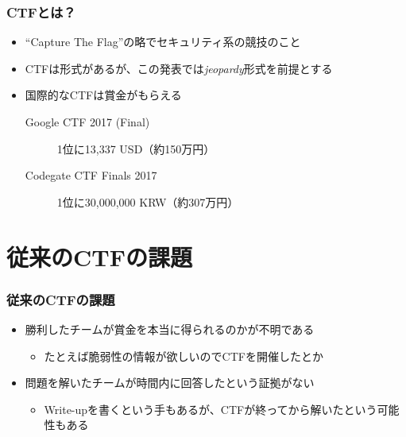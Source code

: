 \begin{frame}
  \frametitle{CTFとは？}

  \pause
  \begin{itemize}
    \item<+-> ``Capture The Flag''の略でセキュリティ系の競技のこと
    \item<+-> CTFは形式があるが、この発表では\emph{jeopardy}形式を前提とする
  \end{itemize}


  \begin{itemize}
    \item<+-> 国際的なCTFは賞金がもらえる
    \begin{description}
      \item[Google CTF 2017 (Final)] 1位に13,337 USD（約150万円）
      \item[Codegate CTF Finals 2017] 1位に30,000,000 KRW（約307万円）
    \end{description}
  \end{itemize}
\end{frame}

\section{従来のCTFの課題}

\begin{frame}
  \frametitle{従来のCTFの課題}

  \pause
  \begin{itemize}
    \item<+-> 勝利したチームが賞金を本当に得られるのかが不明である
    \begin{itemize}
      \item たとえば脆弱性の情報が欲しいのでCTFを開催したとか
    \end{itemize}

    \item<+-> 問題を解いたチームが時間内に回答したという証拠がない
    \begin{itemize}
      \item Write-upを書くという手もあるが、CTFが終ってから解いたという可能性もある
    \end{itemize}
  \end{itemize}
\end{frame}

